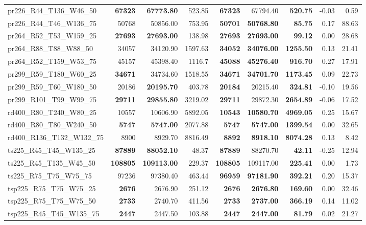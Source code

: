 \documentclass{singlecol-new}
\begin{document}
{\begin{longtable}{lrrrrrrrr}
		pr226\_R44\_T136\_W46\_50 & \textbf{67323} & \textbf{67773.80} & 523.85 & \textbf{67323} & 67794.40 & \textbf{520.75} & -0.03 & 0.59 \\
		pr226\_R44\_T46\_W136\_75 & 50768 & 50856.00 & 753.95 & \textbf{50701} & \textbf{50768.80} & \textbf{85.75} & 0.17 & 88.63 \\
		pr264\_R52\_T53\_W159\_25 & \textbf{27693} & \textbf{27693.00} & 138.98 & \textbf{27693} & \textbf{27693.00} & \textbf{99.12} & 0.00 & 28.68 \\
		pr264\_R88\_T88\_W88\_50 & 34057 & 34120.90 & 1597.63 & \textbf{34052} & \textbf{34076.00} & \textbf{1255.50} & 0.13 & 21.41 \\
		pr264\_R52\_T159\_W53\_75 & 45157 & 45398.40 & 1116.7 & \textbf{45088} & \textbf{45276.40} & \textbf{916.70} & 0.27 & 17.91 \\
		pr299\_R59\_T180\_W60\_25 & \textbf{34671} & 34734.60 & 1518.55 & \textbf{34671} & \textbf{34701.70} & \textbf{1173.45} & 0.09 & 22.73 \\
		pr299\_R59\_T60\_W180\_50 & 20186 & \textbf{20195.70} & 403.78 & \textbf{20184} & 20215.40 & \textbf{324.81} & -0.10 & 19.56 \\
		pr299\_R101\_T99\_W99\_75 & \textbf{29711} & \textbf{29855.80} & 3219.02 & \textbf{29711} & 29872.30 & \textbf{2654.89} & -0.06 & 17.52 \\
		rd400\_R80\_T240\_W80\_25 & 10557 & 10606.90 & 5892.05 & \textbf{10543} & \textbf{10580.70} & \textbf{4969.05} & 0.25 & 15.67 \\
		rd400\_R80\_T80\_W240\_50 & \textbf{5747} & \textbf{5747.00} & 2077.88 & \textbf{5747} & \textbf{5747.00} & \textbf{1399.54} & 0.00 & 32.65 \\
		rd400\_R136\_T132\_W132\_75 & 8900 & 8929.70 & 8816.49 & \textbf{8892} & \textbf{8918.10} & \textbf{8074.28} & 0.13 & 8.42 \\
		ts225\_R45\_T45\_W135\_25 & \textbf{87889} & \textbf{88052.10} & 48.37 & \textbf{87889} & 88270.70 & \textbf{42.11} & -0.25 & 12.94 \\
		ts225\_R45\_T135\_W45\_50 & \textbf{108805} & \textbf{109113.00} & 229.37 & \textbf{108805} & 109117.00 & \textbf{225.41} & 0.00 & 1.73 \\
		ts225\_R75\_T75\_W75\_75 & 97236 & 97380.40 & 463.44 & \textbf{96959} & \textbf{97181.90} & \textbf{392.21} & 0.20 & 15.37 \\
		tsp225\_R75\_T75\_W75\_25 & \textbf{2676} & 2676.90 & 251.12 & \textbf{2676} & \textbf{2676.80} & \textbf{169.60} & 0.00 & 32.46 \\
		tsp225\_R75\_T75\_W75\_50 & \textbf{2733} & 2740.70 & 411.56 & \textbf{2733} & \textbf{2737.00} & \textbf{366.19} & 0.14 & 11.02 \\
		tsp225\_R45\_T45\_W135\_75 & \textbf{2447} & 2447.50 & 103.88 & \textbf{2447} & \textbf{2447.00} & \textbf{81.79} & 0.02 & 21.27 \\
		\hline
	\end{longtable}
	
}
\end{document}
